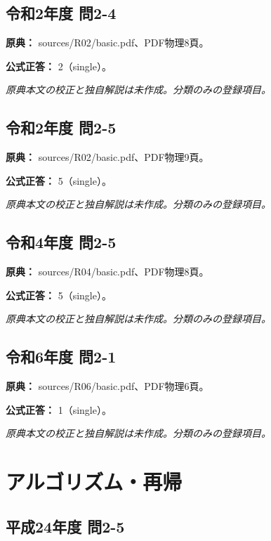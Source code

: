 \subsection{令和2年度 問2-4}
\label{q:r02-reg-basic-2-4}

\noindent\textbf{原典：} sources/R02/basic.pdf、PDF物理8頁。

\textbf{公式正答：} 2（single）。

\par\textit{原典本文の校正と独自解説は未作成。分類のみの登録項目。}

\subsection{令和2年度 問2-5}
\label{q:r02-reg-basic-2-5}

\noindent\textbf{原典：} sources/R02/basic.pdf、PDF物理9頁。

\textbf{公式正答：} 5（single）。

\par\textit{原典本文の校正と独自解説は未作成。分類のみの登録項目。}

\subsection{令和4年度 問2-5}
\label{q:r04-reg-basic-2-5}

\noindent\textbf{原典：} sources/R04/basic.pdf、PDF物理8頁。

\textbf{公式正答：} 5（single）。

\par\textit{原典本文の校正と独自解説は未作成。分類のみの登録項目。}

\subsection{令和6年度 問2-1}
\label{q:r06-reg-basic-2-1}

\noindent\textbf{原典：} sources/R06/basic.pdf、PDF物理6頁。

\textbf{公式正答：} 1（single）。

\par\textit{原典本文の校正と独自解説は未作成。分類のみの登録項目。}

\section{アルゴリズム・再帰}

\subsection{平成24年度 問2-5}
\label{q:h24-reg-basic-2-5}


